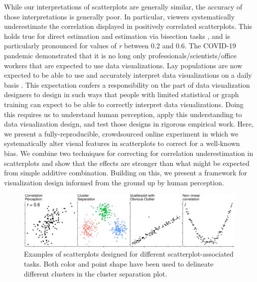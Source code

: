 \documentclass[manuscript, review, anonymous, screen]{acmart}
\begin{document}
While our interpretations of scatterplots are generally similar, the
accuracy of those interpretations is generally poor. In particular,
viewers systematically underestimate the correlation displayed in
positively correlated scatterplots. This holds true for direct
estimation
\citep{strahan_1978, bobko_1979, cleveland_1982, lane_1985, lauer_1989, collyer_1990, meyer_1992}
and estimation via bisection tasks \citep{rensink_2017}, and is
particularly pronounced for values of \emph{r} between 0.2 and 0.6. The
COVID-19 pandemic demonstrated that it is no long only
professionals/scientists/office workers that are expected to use data
visualizations. Lay populations are now expected to be able to use and
accurately interpret data visualizations on a daily basis
\citep{bbc_2022}. This expectation confers a responsibility on the part
of data visualization designers to design in such ways that people with
limited statistical or graph training can expect to be able to correctly
interpret data visualizations. Doing this requires us to understand
human perception, apply this understanding to data visualization design,
and test those designs in rigorous empirical work. Here, we present a
fully-reproducible, crowdsourced online experiment in which we
systematically alter visual features in scatterplots to correct for a
well-known bias. We combine two techniques for correcting for
correlation underestimation in scatterplots and show that the effects
are stronger than what might be expected from simple additive
combination. Building on this, we present a framework for visualization
design informed from the ground up by human perception.

\begin{figure}

{\centering \includegraphics[width=1\textwidth,height=\textheight]{size_and_opacity_files/figure-pdf/fig-tasks-1.pdf}

}

\caption{\label{fig-tasks}Examples of scatterplots designed for
different scatterplot-associated tasks. Both color and point shape have
been used to delineate different clusters in the cluster separation
plot.}

\end{figure}
\end{document}
